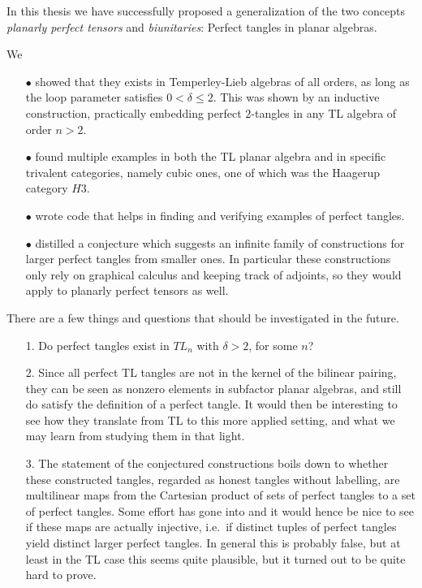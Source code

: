 In this thesis we have successfully proposed a generalization of the two concepts \emph{planarly perfect tensors} and \emph{biunitaries}: Perfect tangles in planar algebras.

We  
\begin{itemize}
\item[$\bullet$] showed that they exists in Temperley-Lieb algebras of all orders, as long as the loop parameter satisfies $0<\delta \leq 2$. This was shown by an inductive construction, practically embedding perfect $2$-tangles in any TL algebra of order $n>2$.
\item[$\bullet$] found multiple examples in both the TL planar algebra and in specific trivalent categories, namely cubic ones, one of which was the Haagerup category $H3$.
\item[$\bullet$] wrote code that helps in finding and verifying examples of perfect tangles.
\item[$\bullet$] distilled a conjecture which suggests an infinite family of constructions for larger perfect tangles from smaller ones. In particular these constructions only rely on graphical calculus and keeping track of adjoints, so they would apply to planarly perfect tensors as well.
\end{itemize}
There are a few things and questions that should be investigated in the future.
\begin{itemize}
\item[1.] Do perfect tangles exist in $TL_n$ with $\delta > 2$, for some $n$? 

\item[2.] Since all perfect TL tangles are not in the kernel of the bilinear pairing, they can be seen as nonzero elements in subfactor planar algebras, and still do satisfy the definition of a perfect tangle. It would then be interesting to see how they translate from TL to this more applied setting, and what we may learn from studying them in that light.

\item[3.] The statement of the conjectured constructions boils down to whether these constructed tangles, regarded as honest tangles without labelling, are multilinear maps from the Cartesian product of sets of perfect tangles to a set of perfect tangles. Some effort has gone into and it would hence be nice to see if these maps are actually injective, i.e.\ if distinct tuples of perfect tangles yield distinct larger perfect tangles. In general this is probably false, but at least in the TL case this seems quite plausible, but it turned out to be quite hard to prove.
\end{itemize}

